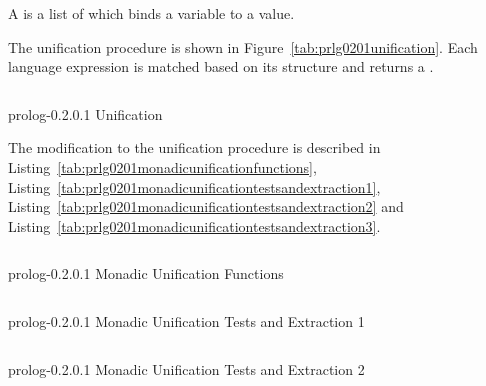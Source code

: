 \documentclass[thesis-solanki.tex]{subfiles}
\begin{document}
A  is a list of  which binds a variable to a value.

The unification procedure is shown in Figure~\ref{tab:prlg0201unification}.
Each language expression is matched based on its structure and returns a  . 


\begin{code-list}[H]
  \begin{singlespace}
    \inputminted[linenos]{haskell}{haskell-proto2-unification-lion.hs}
  \end{singlespace}
\caption{prolog-0.2.0.1 Unification}
\label{tab:prlg0201unification}
\end{code-list}

The modification to the unification procedure is described in Listing~\ref{tab:prlg0201monadicunificationfunctions}, 
Listing~\ref{tab:prlg0201monadicunificationtestsandextraction1}, Listing~\ref{tab:prlg0201monadicunificationtestsandextraction2} and 
Listing~\ref{tab:prlg0201monadicunificationtestsandextraction3}.


\begin{code-list}[H]
  \begin{singlespace}
    \inputminted[linenos]{haskell}{haskell-proto2-monadic-unification-functions.hs}
  \end{singlespace}
\caption{prolog-0.2.0.1 Monadic Unification Functions}
\label{tab:prlg0201monadicunificationfunctions}
\end{code-list}

\begin{code-list}[H]
  \begin{singlespace}
    \inputminted[linenos,lastline=30]{haskell}{haskell-proto2-monadic-unification-tests-and-extraction.hs}
  \end{singlespace}
\caption{prolog-0.2.0.1 Monadic Unification Tests and Extraction 1}
\label{tab:prlg0201monadicunificationtestsandextraction1}
\end{code-list}

\begin{code-list}[H]
  \begin{singlespace}
    \inputminted[linenos,firstline=32]{haskell}{haskell-proto2-monadic-unification-tests-and-extraction.hs}
  \end{singlespace}
\caption{prolog-0.2.0.1 Monadic Unification Tests and Extraction 2}
\label{tab:prlg0201monadicunificationtestsandextraction2}
\end{code-list}
\end{document}
